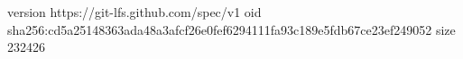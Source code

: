 version https://git-lfs.github.com/spec/v1
oid sha256:cd5a25148363ada48a3afcf26e0fef6294111fa93c189e5fdb67ce23ef249052
size 232426
